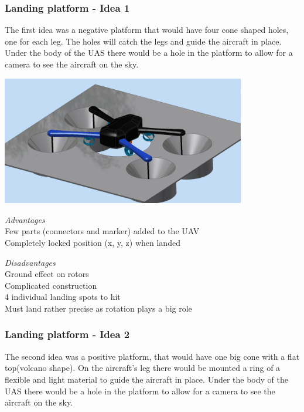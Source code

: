 \subsubsection{Landing platform - Idea 1}
The first idea was a negative platform that would have four cone shaped holes, one for each leg. The holes will catch the legs and guide the aircraft in place. Under the body of the UAS there would be a hole in the platform to allow for a camera to see the aircraft on the sky.
\begin{center}
	\includegraphics[width=0.8\textwidth]{imgs/mockup_idea_2}
\end{center}
\begin{center}
	\begin{minipage}[t]{0.45\textwidth}
		\begin{flushleft}
			\emph{Advantages}\\
			Few parts (connectors and marker) added to the UAV\\
			Completely locked position (x, y, z) when landed
		\end{flushleft}
	\end{minipage}
	\begin{minipage}[t]{0.45\textwidth}
		\begin{flushleft}
			\emph{Disadvantages}\\
			Ground effect on rotors\\
			Complicated construction \\
			4 individual landing spots to hit\\
			Must land rather precise as rotation plays a big role
		\end{flushleft}
	\end{minipage}
\end{center}

\subsubsection{Landing platform - Idea 2}
The second idea was a positive platform, that would have one big cone with a flat top(volcano shape). On the aircraft's leg there would be mounted a ring of a flexible and light material to guide the aircraft in place. Under the body of the UAS there would be a hole in the platform to allow for a camera to see the aircraft on the sky.

